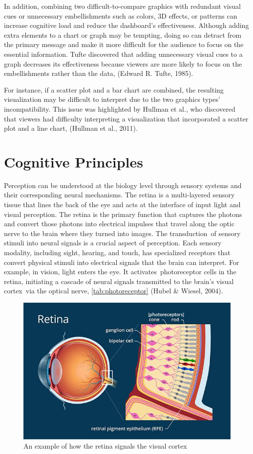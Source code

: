 \documentclass[print]{nuthesis}
\begin{document}
In addition, combining two difficult-to-compare graphics with redundant visual cues or unnecessary embellishments such as colors, 3D effects, or patterns can increase cognitive load and reduce the dashboard's effectiveness.
Although adding extra elements to a chart or graph may be tempting, doing so can detract from the primary message and make it more difficult for the audience to focus on the essential information.
Tufte discovered that adding unnecessary visual cues to a graph decreases its effectiveness because viewers are more likely to focus on the embellishments rather than the data, (Edward R. Tufte, 1985).

For instance, if a scatter plot and a bar chart are combined, the resulting visualization may be difficult to interpret due to the two graphics types' incompatibility.
This issue was highlighted by Hullman et al., who discovered that viewers had difficulty interpreting a visualization that incorporated a scatter plot and a line chart, (Hullman et al., 2011).

\hypertarget{cognitive-principles}{%
\section{Cognitive Principles}\label{cognitive-principles}}

Perception can be understood at the biology level through sensory systems and their corresponding neural mechanisms.
The retina is a multi-layered sensory tissue that lines the back of the eye and acts at the interface of input light and visual perception.
The retina is the primary function that captures the photons and convert those photons into electrical impulses that travel along the optic nerve to the brain where they turned into images.
The transduction~of sensory stimuli into neural signals is a crucial aspect of perception.
Each sensory modality, including sight, hearing, and touch, has specialized receptors that convert physical stimuli into electrical signals that the brain can interpret.
For example, in vision, light enters the eye.
It activates~photoreceptor cells in the retina, initiating a cascade of neural signals transmitted to the brain's visual cortex~via the optical nerve, \ref{tab:photoreceptor} (Hubel \& Wiesel, 2004).

\begin{figure}

{\centering \includegraphics[width=0.55\linewidth]{figure/photoreceptors_image} 

}

\caption{An example of how the retina signals the visual cortex}\label{fig:unnamed-chunk-3}
\end{figure}
\end{document}

